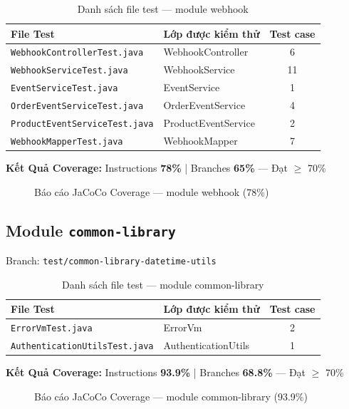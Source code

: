 \begin{table}[H]
\centering
\caption{Danh sách file test --- module webhook}
\begin{tabular}{|l|l|c|}
\hline
\textbf{File Test} & \textbf{Lớp được kiểm thử} & \textbf{Test case} \\
\hline
\texttt{WebhookControllerTest.java} & WebhookController & 6 \\
\hline
\texttt{WebhookServiceTest.java} & WebhookService & 11 \\
\hline
\texttt{EventServiceTest.java} & EventService & 1 \\
\hline
\texttt{OrderEventServiceTest.java} & OrderEventService & 4 \\
\hline
\texttt{ProductEventServiceTest.java} & ProductEventService & 2 \\
\hline
\texttt{WebhookMapperTest.java} & WebhookMapper & 7 \\
\hline
\end{tabular}
\end{table}

\textbf{Kết Quả Coverage:} Instructions \textbf{78\%} | Branches \textbf{65\%} --- Đạt $\geq$ 70\%

\begin{figure}[H]
\centering
{}
\caption{Báo cáo JaCoCo Coverage --- module webhook (78\%)}
\end{figure}

\subsection{Module \texttt{common-library}}

Branch: \texttt{test/common-library-datetime-utils}

\begin{table}[H]
\centering
\caption{Danh sách file test --- module common-library}
\begin{tabular}{|l|l|c|}
\hline
\textbf{File Test} & \textbf{Lớp được kiểm thử} & \textbf{Test case} \\
\hline
\texttt{ErrorVmTest.java} & ErrorVm & 2 \\
\hline
\texttt{AuthenticationUtilsTest.java} & AuthenticationUtils & 1 \\
\hline
\end{tabular}
\end{table}

\textbf{Kết Quả Coverage:} Instructions \textbf{93.9\%} | Branches \textbf{68.8\%} --- Đạt $\geq$ 70\%

\begin{figure}[H]
\centering
{}
\caption{Báo cáo JaCoCo Coverage --- module common-library (93.9\%)}
\end{figure}
